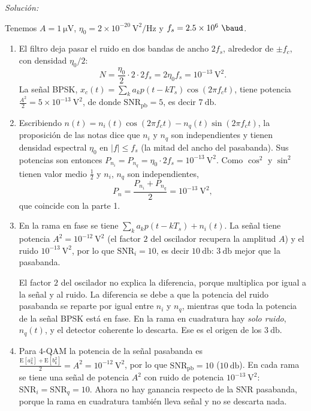 \documentclass[a4paper,11pt]{article}
\newcommand{\E}[1]{\mathrm{E}\left[#1\right]}
\newenvironment{solucion}[1][]{
\noindent \large \textsl{Solución:} \ifthenelse{\equal{#1}{}}{}{\emph{(#1)}}

\smallskip
}{
\bigskip
}
\begin{document}
\begin{solucion}
Tenemos $A=1\ \unit{\micro\volt}$, $\eta_0=2\times10^{-20}\ \unit{\square\volt/\hertz}$ y $f_s=2.5\times10^6\ \unit{\baud}$.
\begin{enumerate}
\item El filtro deja pasar el ruido en dos bandas de ancho $2f_s$, alrededor de $\pm f_c$, con densidad $\eta_0/2$:
\begin{equation*}
N=\frac{\eta_0}{2}\cdot 2\cdot 2f_s=2\eta_0f_s=10^{-13}\ \unit{\square\volt}.
\end{equation*}
La señal BPSK, $x_c(t)=\sum_ka_kp(t-kT_s)\cos(2\pi f_ct)$, tiene potencia $\frac{A^2}{2}=5\times10^{-13}\ \unit{\square\volt}$, de donde $\mathrm{SNR}_{\text{pb}}=5$, es decir $7\ \unit{\decibel}$.
\item Escribiendo $n(t)=n_i(t)\cos(2\pi f_ct)-n_q(t)\sin(2\pi f_ct)$, la proposición de las notas dice que $n_i$ y $n_q$ son independientes y tienen densidad espectral $\eta_0$ en $|f|\leqslant f_s$ (la mitad del ancho del pasabanda). Sus potencias son entonces $P_{n_i}=P_{n_q}=\eta_0\cdot2f_s=10^{-13}\ \unit{\square\volt}$. Como $\cos^2$ y $\sin^2$ tienen valor medio $\frac12$ y $n_i$, $n_q$ son independientes,
\begin{equation*}
P_n=\frac{P_{n_i}+P_{n_q}}{2}=10^{-13}\ \unit{\square\volt},
\end{equation*}
que coincide con la parte 1.
\item En la rama en fase se tiene $\sum_ka_kp(t-kT_s)+n_i(t)$. La señal tiene potencia $A^2=10^{-12}\ \unit{\square\volt}$ (el factor $2$ del oscilador recupera la amplitud $A$) y el ruido $10^{-13}\ \unit{\square\volt}$, por lo que $\mathrm{SNR}_i=10$, es decir $10\ \unit{\decibel}$: $3\ \unit{\decibel}$ mejor que la pasabanda.

El factor $2$ del oscilador no explica la diferencia, porque multiplica por igual a la señal y al ruido. La diferencia se debe a que la potencia del ruido pasabanda se reparte por igual entre $n_i$ y $n_q$, mientras que toda la potencia de la señal BPSK está en fase. En la rama en cuadratura hay \emph{solo ruido}, $n_q(t)$, y el detector coherente lo descarta. Ese es el origen de los $3\ \unit{\decibel}$.
\item Para $4$-QAM la potencia de la señal pasabanda es $\frac{\E{a_k^2}+\E{b_k^2}}{2}=A^2=10^{-12}\ \unit{\square\volt}$, por lo que $\mathrm{SNR}_{\text{pb}}=10$ ($10\ \unit{\decibel}$). En cada rama se tiene una señal de potencia $A^2$ con ruido de potencia $10^{-13}\ \unit{\square\volt}$: $\mathrm{SNR}_i=\mathrm{SNR}_q=10$. Ahora no hay ganancia respecto de la SNR pasabanda, porque la rama en cuadratura también lleva señal y no se descarta nada.


\end{enumerate}
\end{solucion}
\end{document}
